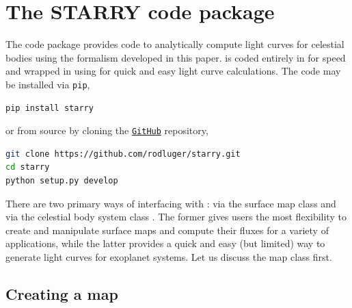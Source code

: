 \documentclass[modern]{aastex61}
\begin{document}
\section{The \textbf{STARRY} code package}
\label{sec:starrycode}

The \starry code package provides code to analytically
compute light curves for celestial bodies using the formalism developed
in this paper. \starry is coded entirely in \cpp for speed and wrapped
in \Python using \pybind \citep{pybind11} for quick and easy
light curve calculations. The
code may be installed via \texttt{pip},
%
\begin{lstlisting}[language=bash]
pip install starry
\end{lstlisting}
%
or from source by cloning the \href{https://github.com/rodluger/starry}{\texttt{GitHub}} repository,
%
\begin{lstlisting}[language=bash]
git clone https://github.com/rodluger/starry.git
cd starry
python setup.py develop
\end{lstlisting}
%
There are two primary ways of interfacing with \starry: via the surface
map class \starryMap and via the celestial body system class
\starrySystem. The former gives users the most flexibility to
create and manipulate surface maps and compute their fluxes for a variety
of applications, while the latter provides a quick and easy (but limited)
way to generate light curves for exoplanet systems. Let us
discuss the map class first.

\subsection{Creating a map}
\label{sec:starrymap}
\end{document}
